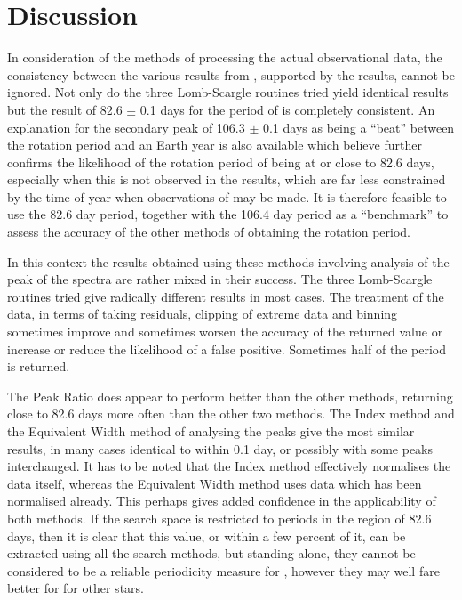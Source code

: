 \chapter{Discussion}
\protect\label{chapter:discussion}

In consideration of the methods of processing the actual observational data, the consistency between the various results
from \asas, supported by the {\hst} results, cannot be ignored. Not only do the three Lomb-Scargle routines tried yield
identical results but the result of 82.6 $\pm$ 0.1 days for the period of {\prox} is completely consistent. An
explanation for the secondary peak of 106.3 $\pm$ 0.1 days as being a ``beat'' between the rotation period and an Earth
year is also available which {\Firstp} believe further confirms the likelihood of the rotation period of {\prox} being
at or close to 82.6 days, especially when this is not observed in the {\hst} results, which are far less constrained by
the time of year when observations of {\prox} may be made. It is therefore feasible to use the 82.6 day period, together
with the 106.4 day period as a ``benchmark'' to assess the accuracy of the other methods of obtaining the rotation
period.

In this context the results obtained using these methods involving analysis of the {\ha} peak of the spectra are rather
mixed in their success. The three Lomb-Scargle routines tried give radically different results in most cases. The
treatment of the data, in terms of taking residuals, clipping of extreme data and binning sometimes improve and
sometimes worsen the accuracy of the returned value or increase or reduce the likelihood of a false positive. Sometimes
half of the period is returned.

The Peak Ratio does appear to perform better than the other methods, returning close to 82.6 days more often than the
other two methods. The {\ha} Index method and the Equivalent Width method of analysing the peaks give the most similar
results, in many cases identical to within 0.1 day, or possibly with some peaks interchanged. It has to be noted that
the {\ha} Index method effectively normalises the data itself, whereas the Equivalent Width method uses data which has
been normalised already. This perhaps gives added confidence in the applicability of both methods.  If the search space
is restricted to periods in the region of 82.6 days, then it is clear that this value, or within a few percent of it,
can be extracted using all the search methods, but standing alone, they cannot be considered to be a reliable
periodicity measure for \prox, however they may well fare better for for other stars.


